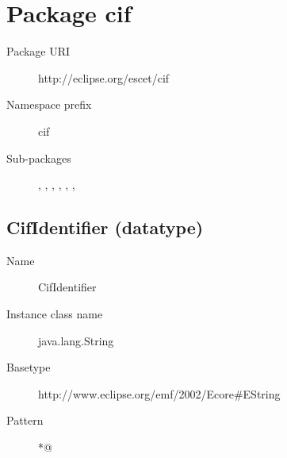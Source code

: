 

\section{Package cif}\label{cifpkg:cif}
\pkgdocucif

\begin{description}
\item[Package URI] http://eclipse.org/escet/cif
\item[Namespace prefix] cif
\item[Sub-packages] , , , , , , 
\end{description}

\subsection{CifIdentifier (datatype)}\label{cifclass:CifIdentifier}
\dtypedocuCifIdentifier

\begin{description}
\item[Name] CifIdentifier
\item[Instance class name] java.lang.String
\item[Basetype] http://www.eclipse.org/emf/2002/Ecore#EString
\item[Pattern] \verb@[A-Za-z_][A-Za-z0-9_]*@
\end{description}

